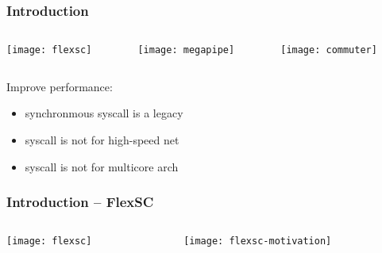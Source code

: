 \begin{frame}[plain]
	\frametitle{Introduction}
	
	
	\begin{columns}
		
		\begin{column}{.3\textwidth}	
			
			\texttt{[image: flexsc]}
			
			
		\end{column}
		
		\begin{column}{.3\textwidth}
			
			\texttt{[image: megapipe]}
		\end{column}
		
		
		
		\begin{column}{.3\textwidth}	
			\texttt{[image: commuter]}
		\end{column}
		
	\end{columns}
	
	Improve performance: 
	\begin{itemize}
		\item synchronmous syscall is a legacy
		\item syscall is not for high-speed net
		\item syscall is not for multicore arch
	\end{itemize}
	
	
\end{frame}	

\begin{frame}[plain]
	\frametitle{Introduction -- FlexSC}
	
	
	\begin{columns}
		
		\begin{column}{.3\textwidth}	
			
			\texttt{[image: flexsc]}
			
			
		\end{column}
		
		\begin{column}{.7\textwidth}
		\texttt{[image: flexsc-motivation]}
		\end{column}
		
	\end{columns}
	
	
\end{frame}	


